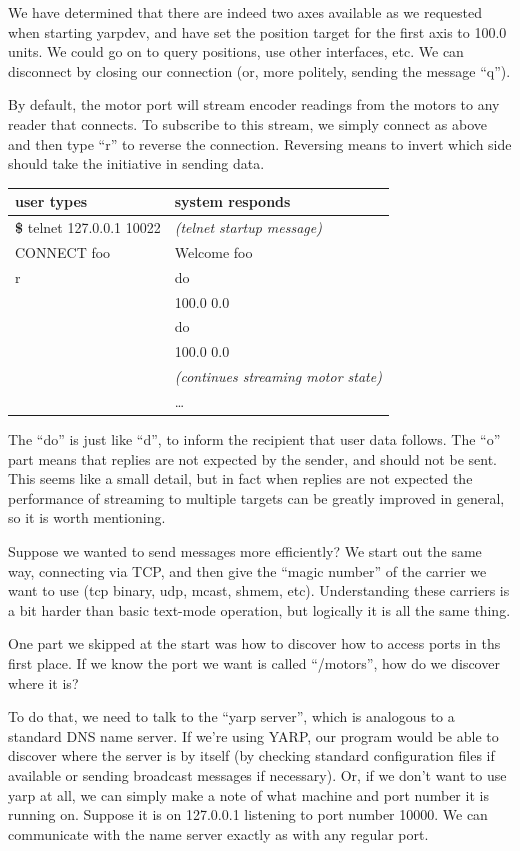We have determined that there are indeed two axes available as we requested
when starting yarpdev, and have set the position target for the
first axis to 100.0 units.  We could go on to query positions, use
other interfaces, etc.  We can disconnect by closing our connection
(or, more politely, sending the message ``q'').

By default, the motor port will stream encoder readings from the motors
to any reader that connects.  To subscribe to this stream, we simply
connect as above and then type ``r'' to reverse the connection.
Reversing means to invert which side should take the initiative
in sending data.


\begin{center}
\begin{tabular}{ll}
\hline\hline
{\bf user types} & {\bf system responds} \\
\hline
{\bf \$} telnet 127.0.0.1 10022 & {\it (telnet startup message)} \\
CONNECT foo & Welcome foo \\
r & do \\
& 100.0 0.0 \\
 & do \\
 & 100.0 0.0 \\
 & {\it (continues streaming motor state)} \\
 & \ldots \\
\hline\hline
\end{tabular}
\end{center}


The ``do'' is just like ``d'', to inform the recipient that user data
follows.  The ``o'' part means that replies are not expected by the
sender, and should not be sent.  This seems like a small detail,
but in fact when replies are not expected the performance of 
streaming to multiple targets can be greatly improved in general,
so it is worth mentioning.

Suppose we wanted to send messages more efficiently?  We start out the
same way, connecting via TCP, and then give the ``magic number'' of
the carrier we want to use (tcp binary, udp, mcast, shmem, etc).
Understanding these carriers is a bit harder than basic text-mode operation,
but logically it is all the same thing.

One part we skipped at the start was how to discover how to 
access ports in ths first place.  If we know the port we want
is called ``/motors'', how do we discover where it is?

To do that, we need to talk to the ``yarp server'', which is analogous
to a standard DNS name server.  If we're using YARP, our program would
be able to discover where the server is by itself (by checking
standard configuration files if available or sending broadcast
messages if necessary).  Or, if we don't want to use yarp at all, we
can simply make a note of what machine and port number it is running
on.  Suppose it is on 127.0.0.1 listening to port number 10000.
We can communicate with the name server exactly as with any regular
port.


